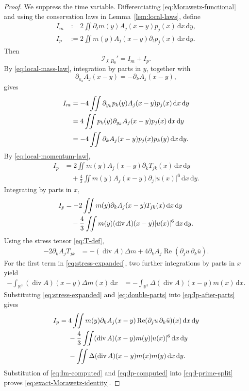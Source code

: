 \documentclass[10pt,a4paper]{amsart}
\newcommand{\Rea}{\operatorname{Re}}
\newcommand{\R}{\mathbb R}
\newcommand{\dd}{\,\mathrm d}
\begin{document}
\begin{proof}
We suppress the time variable. Differentiating \eqref{eq:Morawetz-functional} and using the conservation laws in Lemma~\ref{lem:local-laws}, define
\begin{align*}
 I_m&:=2\iint \partial_tm(y)A_j(x-y)p_j(x)\dd x\dd y,\\
 I_p&:=2\iint m(y)A_j(x-y)\partial_tp_j(x)\dd x\dd y.
\end{align*}
Then
\begin{equation}\label{eq:I-prime-split}
 \mathcal I_{J,R_0}'=I_m+I_p.
\end{equation}
By \eqref{eq:local-mass-law}, integration by parts in $y$, together with
\[
 \partial_{y_k}A_j(x-y)=-\partial_kA_j(x-y),
\]
gives
\begin{align}
 I_m
 &=-4\iint \partial_{y_k}p_k(y)A_j(x-y)p_j(x)\dd x\dd y
 \notag\\
 &=4\iint p_k(y)\partial_{y_k}A_j(x-y)p_j(x)\dd x\dd y
 \notag\\
 &=-4\iint \partial_kA_j(x-y)p_j(x)p_k(y)\dd x\dd y.
 \label{eq:Im-computed}
\end{align}
By \eqref{eq:local-momentum-law},
\begin{align*}
 I_p
 &=2\iint m(y)A_j(x-y)\partial_kT_{jk}(x)\dd x\dd y\\
 &\quad+\frac43\iint m(y)A_j(x-y)\partial_j|u(x)|^6\dd x\dd y.
\end{align*}
Integrating by parts in $x$,
\begin{align}
 I_p
 &=-2\iint m(y)\partial_kA_j(x-y)T_{jk}(x)\dd x\dd y
 \notag\\
 &\quad-\frac43\iint m(y)(\operatorname{div}A)(x-y)|u(x)|^6\dd x\dd y.
 \label{eq:Ip-after-parts}
\end{align}
Using the stress tensor \eqref{eq:T-def},
\begin{align}
 -2\partial_kA_jT_{jk}
 &=-(\operatorname{div}A)\Delta m
 +4\partial_kA_j\Rea(\partial_ju\,\partial_k\bar u).
 \label{eq:stress-expanded}
\end{align}
For the first term in \eqref{eq:stress-expanded}, two further integrations by parts in $x$ yield
\begin{align}
 -\int_{\R^3}(\operatorname{div}A)(x-y)\Delta m(x)\dd x
 &=-\int_{\R^3}\Delta(\operatorname{div}A)(x-y)m(x)\dd x.
 \label{eq:double-parts}
\end{align}
Substituting \eqref{eq:stress-expanded} and \eqref{eq:double-parts} into \eqref{eq:Ip-after-parts} gives
\begin{align}
 I_p
 ={}&4\iint m(y)\partial_kA_j(x-y)
 \Rea(\partial_ju\,\partial_k\bar u)(x)\dd x\dd y
 \notag\\
 &-\frac43\iint
 (\operatorname{div}A)(x-y)m(y)|u(x)|^6\dd x\dd y
 \notag\\
 &-\iint
 \Delta(\operatorname{div}A)(x-y)m(x)m(y)\dd x\dd y.
 \label{eq:Ip-computed}
\end{align}
Substitution of \eqref{eq:Im-computed} and \eqref{eq:Ip-computed} into \eqref{eq:I-prime-split} proves \eqref{eq:exact-Morawetz-identity}.


\end{proof}
\end{document}

